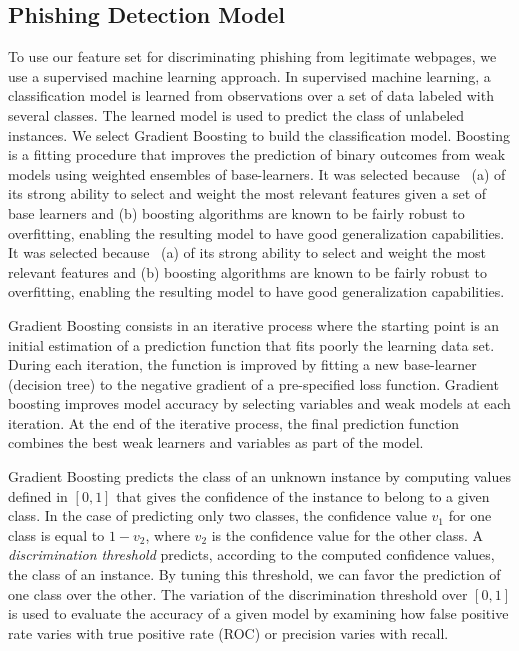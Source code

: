 \documentclass[10pt,conference,compsocconf,letterpaper]{IEEEtran}
\begin{document}
\subsection{Phishing Detection Model} 

To use our feature set for discriminating phishing from legitimate webpages, we use a supervised machine learning approach. In supervised machine learning, a classification model is learned from observations over a set of data labeled with several classes. The learned model is used to predict the class of unlabeled instances. 
We select Gradient Boosting  \cite{friedman:2002:stochastic} to build the classification model.
\iffeateval
Boosting \cite{freund:1999:ashort} is a fitting procedure that improves the prediction of binary outcomes from weak models using weighted ensembles of base-learners.
It was selected because~\cite{buhlmann:2007:boosting} (a) of its strong ability to select and weight the most relevant features given a set of base learners and (b) boosting algorithms are known to be fairly robust to overfitting, enabling the resulting model to have good generalization capabilities.
\else
It was selected because~\cite{buhlmann:2007:boosting} (a) of its strong ability to select and weight the most relevant features
and (b) boosting algorithms are known to be fairly robust to overfitting, enabling the resulting model to have good generalization capabilities.
\fi


\iffullversion
Gradient Boosting consists in an iterative process where the starting point is an initial estimation of a prediction function that fits poorly the learning data set. During each iteration, the function is improved by fitting a new base-learner (decision tree) to the negative gradient of a pre-specified loss function. Gradient boosting improves model accuracy by selecting variables and weak models at each iteration. At the end of the iterative process, the final prediction function combines the best weak learners and variables as part of the model.
\fi

Gradient Boosting predicts the class of an unknown instance by computing values defined in $\left[ 0,1 \right]$ that gives the confidence of the instance to belong to a given class. In the case of predicting only two classes, the confidence value $v_1$ for one class is equal to $1-v_2$, where $v_2$ is the confidence value for the other class. A \emph{discrimination threshold} predicts, according to the computed confidence values, the class of an instance. By tuning this threshold, we can favor the prediction of one class over the other.
The variation of the discrimination threshold over $\left[ 0,1 \right]$ is used to evaluate the accuracy of a given model by examining how false positive rate varies with true positive rate (ROC) or precision varies with recall.
\end{document}
